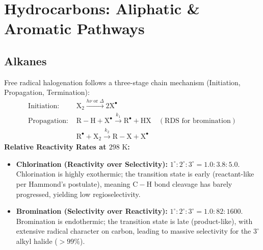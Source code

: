 \documentclass[10pt,a4paper]{article}
\begin{document}
\section{Hydrocarbons: Aliphatic \& Aromatic Pathways}

\subsection{Alkanes}

\begin{formulabox}
Free radical halogenation follows a three-stage chain mechanism (Initiation, Propagation, Termination):
\begin{align}
  \text{Initiation: } & \mathrm{X_2} \xrightarrow{h\nu \text{ or } \Delta} 2\mathrm{X}^\bullet\\
  \text{Propagation: } & \mathrm{R-H} + \mathrm{X}^\bullet \xrightarrow{k_1} \mathrm{R}^\bullet + \mathrm{HX} \quad (\text{RDS for bromination})\\
  & \mathrm{R}^\bullet + \mathrm{X_2} \xrightarrow{k_2} \mathrm{R-X} + \mathrm{X}^\bullet
\end{align}
\textbf{Relative Reactivity Rates at $298\text{ K}$:}
\begin{itemize}
  \item \textbf{Chlorination (Reactivity over Selectivity):} $1^\circ : 2^\circ : 3^\circ = 1.0 : 3.8 : 5.0$. Chlorination is highly exothermic; the transition state is early (reactant-like per Hammond's postulate), meaning $\mathrm{C-H}$ bond cleavage has barely progressed, yielding low regioselectivity.
  \item \textbf{Bromination (Selectivity over Reactivity):} $1^\circ : 2^\circ : 3^\circ = 1.0 : 82 : 1600$. Bromination is endothermic; the transition state is late (product-like), with extensive radical character on carbon, leading to massive selectivity for the $3^\circ$ alkyl halide ($> 99\%$).
\end{itemize}
\end{formulabox}
\end{document}

